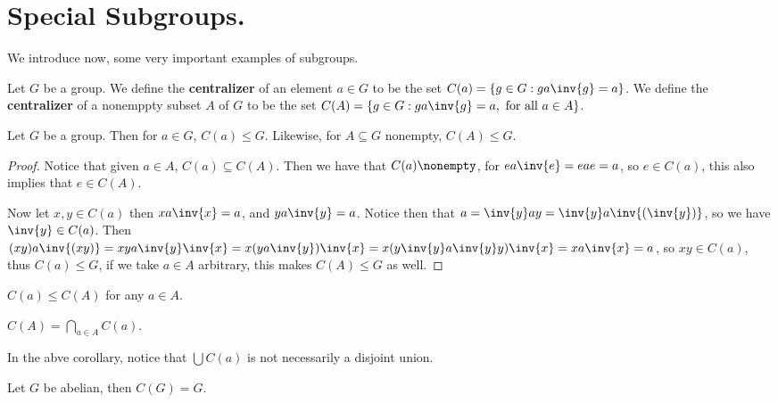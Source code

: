 
\section{Special Subgroups.}
\label{section1}

We introduce now, some very important examples of subgroups.

\begin{definition}
    Let $G$ be a group. We define the \textbf{centralizer} of an element $a \in
    G$ to be the set $C(a)=\{g \in G: ga\inv{g}=a\}$. We define the
    \textbf{centralizer} of a nonemppty subset $A$ of  $G$ to be the set
    $C(A)=\{g \in G : ga\inv{g}=a, \text{ for all } a \in A\}$.
\end{definition}

\begin{lemma}\label{2.2.1}
    Let $G$ be a group. Then for  $a \in G$,  $C(a) \leq G$. Likewise, for $A
    \subseteq G$ nonempty, $C(A) \leq G$.
\end{lemma}
\begin{proof}
    Notice that given $a \in A$,  $C(a) \subseteq C(A)$. Then we have that $C(a)
    \nonempty$, for $ea\inv{e}=eae=a$, so $e \in C(a)$, this also implies that
    $e \in C(A)$.

    Now let $x,y \in C(a)$ then $xa\inv{x}=a$, and $ya\inv{y}=a$. Notice then
    that  $a=\inv{y}ay=\inv{y}a\inv{(\inv{y})}$, so we have $\inv{y} \in C(a)$.
    Then
    $(xy)a\inv{(xy)}=xya\inv{y}\inv{x}=x(ya\inv{y})\inv{x}=x(y\inv{y}a\inv{y}y)
    \inv{x}=xa\inv{x}=a$, so $xy \in C(a)$, thus $C(a) \leq G$, if we take $a
    \in A$ arbitrary, this makes  $C(A) \leq G$ as well.
\end{proof}
\begin{corollary}
    $C(a) \leq C(A)$ for any $a \in A$.
\end{corollary}
\begin{corollary}
    $C(A)=\bigcap_{a \in A}{C(a)}$.
\end{corollary}
\begin{remark}
    In the abve corollary, notice that $\bigcup{C(a)}$ is not necessarily a
    disjoint union.
\end{remark}

\begin{example}
    Let $G$ be abelian, then  $C(G)=G$.
\end{example}

